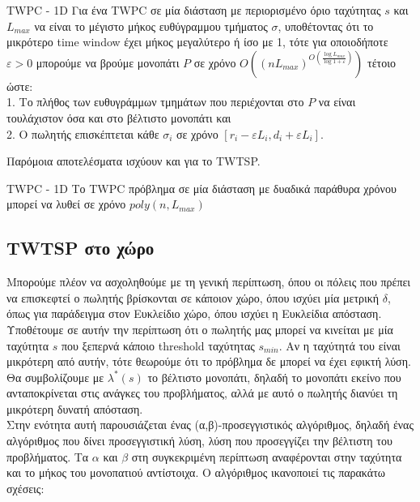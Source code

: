 \documentclass[oneside,12pt]{book}
\theoremstyle{definition}
\begin{document}
\begin{mytheorem}{TWPC - 1D}{}
	Για ένα TWPC σε μία διάσταση με περιορισμένο όριο ταχύτητας \(s\) και \(L_{max}\) να είναι το μέγιστο μήκος ευθύγραμμου τμήματος \(σ\), υποθέτοντας ότι το μικρότερο time window έχει μήκος μεγαλύτερο ή ίσο με 1, τότε για οποιοδήποτε \(ε > 0\) μπορούμε να βρούμε μονοπάτι \(P\) σε χρόνο \(Ο((nL_{max})^{O(\frac{\log L_{max}}{\log 1 + ε})})\) τέτοιο ώστε: \\
	1. Το πλήθος των ευθυγράμμων τμημάτων που περιέχονται στο \(P\) να είναι τουλάχιστον όσα και στο βέλτιστο μονοπάτι και \\
	2. Ο πωλητής επισκέπτεται κάθε \(σ_i\) σε χρόνο \([r_i - εL_i, d_i + εL_i]\). 
\end{mytheorem}

Παρόμοια αποτελέσματα ισχύουν και για το TWTSP. \\

\begin{mylemma}{TWPC - 1D}{}
	Το TWPC πρόβλημα σε μία διάσταση με δυαδικά παράθυρα χρόνου μπορεί να λυθεί σε χρόνο \(poly(n,L_{max})\)
\end{mylemma}

\subsection{TWTSP στο χώρο}

Μπορούμε πλέον να ασχοληθούμε με τη γενική περίπτωση, όπου οι πόλεις που πρέπει να επισκεφτεί ο πωλητής βρίσκονται σε κάποιον χώρο, όπου ισχύει μία μετρική \(δ\), όπως για παράδειγμα στον Ευκλείδιο χώρο, όπου ισχύει η Ευκλείδια απόσταση. \\

Υποθέτουμε σε αυτήν την περίπτωση ότι ο πωλητής μας μπορεί να κινείται με μία ταχύτητα \(s\) που ξεπερνά κάποιο threshold ταχύτητας \(s_{min}\). Αν η ταχύτητά του είναι μικρότερη από αυτήν, τότε θεωρούμε ότι το πρόβλημα δε μπορεί να έχει εφικτή λύση. \\

Θα συμβολίζουμε με \(λ^{*}(s)\) το βέλτιστο μονοπάτι, δηλαδή το μονοπάτι εκείνο που ανταποκρίνεται στις ανάγκες του προβλήματος, αλλά με αυτό ο πωλητής διανύει τη μικρότερη δυνατή απόσταση. \\

Στην ενότητα αυτή παρουσιάζεται ένας (α,β)-προσεγγιστικός αλγόριθμος, δηλαδή ένας αλγόριθμος που δίνει προσεγγιστική λύση, λύση που προσεγγίζει την βέλτιστη του προβλήματος. Τα \(α\) και \(β\) στη συγκεκριμένη περίπτωση αναφέρονται στην ταχύτητα και το μήκος του μονοπατιού αντίστοιχα. Ο αλγόριθμος ικανοποιεί τις παρακάτω σχέσεις:
\end{document}

